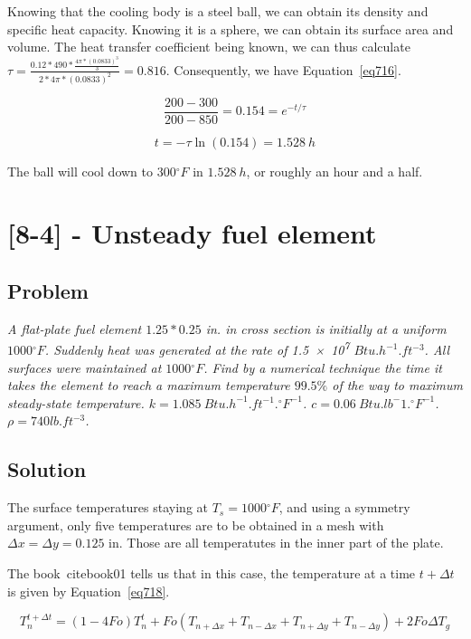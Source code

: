 Knowing that the cooling body is a steel ball, we can obtain its density and specific heat capacity. Knowing it is a sphere, we can obtain its surface area and volume. The heat transfer coefficient being known, we can thus calculate $\tau = \frac{0.12 * 490 * \frac{4\pi * (0.0833)^3}{3}}{2 * 4\pi * (0.0833)^2} = 0.816$. Consequently, we have Equation~\ref{eq716}.

\begin{equation}\label{eq716}
\frac{200 - 300}{200 - 850} = 0.154 = e^{-t/\tau}
\end{equation}

\begin{equation}\label{eq717}
t = -\tau \ln (0.154) = 1.528\ h
\end{equation}

The ball will cool down to $300{}^\circ F$ in $1.528\ h$, or roughly an hour and a half.

\section{[8-4] - Unsteady fuel element}
\label{prob74}

\subsection{Problem}
\textit{A flat-plate fuel element $1.25 * 0.25$ in. in cross section is initially at a uniform $1000{}^\circ F$. Suddenly heat was generated at the rate of \num{1.5e7} $Btu.h^{-1}.ft^{-3}$. All surfaces were maintained at $1000{}^\circ F$. Find by a numerical technique the time it takes the element to reach a maximum temperature $99.5\%$ of the way to maximum steady-state temperature. $k=1.085\ Btu.h^{-1}.ft^{-1}.{}^\circ F^{-1}$. $c = 0.06\ Btu.lb^-1.{}^\circ F^{-1}$. $\rho = 740 lb.ft^{-3}$.}

\subsection{Solution}

The surface temperatures staying at $T_s = 1000{}^\circ F$, and using a symmetry argument, only five temperatures are to be obtained in a mesh with $\Delta x = \Delta y = 0.125$ in. Those are all temperatutes in the inner part of the plate.

The book~cite{book01} tells us that in this case, the temperature at a time $t+\Delta t$ is given by Equation~\ref{eq718}.

\begin{equation}\label{eq718}
T_n^{t+\Delta t} = (1-4Fo)T_n^t + Fo(T_{n+\Delta x} + T_{n-\Delta x} + T_{n+\Delta y} + T_{n-\Delta y}) + 2Fo\Delta T_g
\end{equation}

